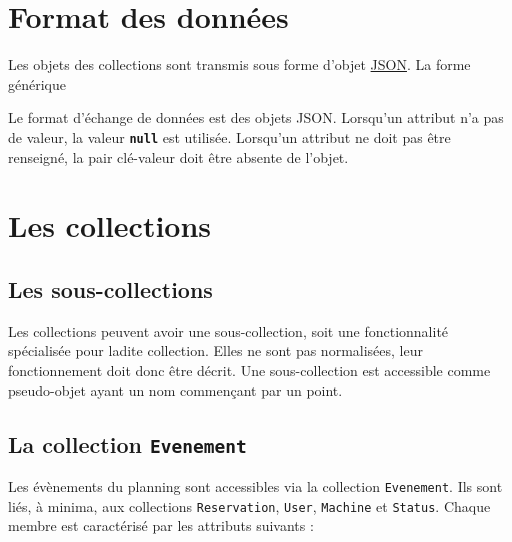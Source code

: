 \documentclass[a4paper,twoside]{article}
\newcommand{\collection}[1]{\colorbox{light-gray}{\texttt{#1}}}
\newcommand{\valeur}[1]{\texttt{{\bf #1}}}
\begin{document}
\section{Format des données}

Les objets des collections sont transmis sous forme d'objet \href{https://www.json.org/json-en.html}{JSON}. La forme générique 


Le format d'échange de données est des objets JSON. Lorsqu'un attribut n'a pas de valeur, la valeur \valeur{null} est utilisée. Lorsqu'un attribut ne doit pas être renseigné, la pair clé-valeur doit être absente de l'objet.

\section{Les collections}

\subsection{Les sous-collections}

Les collections peuvent avoir une sous-collection, soit une fonctionnalité spécialisée pour ladite collection. Elles ne sont pas normalisées, leur fonctionnement doit donc être décrit. Une sous-collection est accessible comme pseudo-objet ayant un nom commençant par un point.

\subsection{La collection \collection{Evenement}}
Les évènements du planning sont accessibles via la collection \collection{Evenement}. Ils sont liés, à minima, aux collections \collection{Reservation}, \collection{User}, \collection{Machine} et \collection{Status}. Chaque membre est caractérisé par les attributs suivants :
\end{document}

